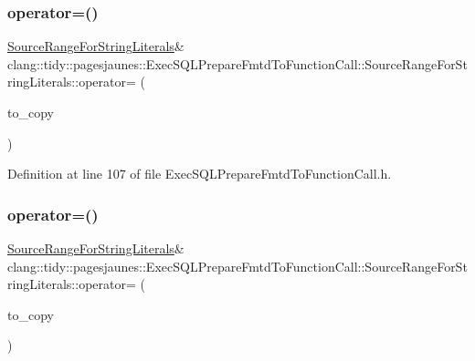 \subsubsection{\texorpdfstring{operator=()}{operator=()}\hspace{0.1cm}{\footnotesize\ttfamily [1/2]}}
{\footnotesize\ttfamily \hyperlink{classclang_1_1tidy_1_1pagesjaunes_1_1_exec_s_q_l_prepare_fmtd_to_function_call_1_1_source_range_for_string_literals}{Source\+Range\+For\+String\+Literals}\& clang\+::tidy\+::pagesjaunes\+::\+Exec\+S\+Q\+L\+Prepare\+Fmtd\+To\+Function\+Call\+::\+Source\+Range\+For\+String\+Literals\+::operator= (\begin{DoxyParamCaption}\item[{const \hyperlink{classclang_1_1tidy_1_1pagesjaunes_1_1_exec_s_q_l_prepare_fmtd_to_function_call_1_1_source_range_for_string_literals}{Source\+Range\+For\+String\+Literals} \&}]{to\+\_\+copy }\end{DoxyParamCaption})\hspace{0.3cm}{\ttfamily [inline]}}



Definition at line 107 of file Exec\+S\+Q\+L\+Prepare\+Fmtd\+To\+Function\+Call.\+h.

\mbox{\label{classclang_1_1tidy_1_1pagesjaunes_1_1_exec_s_q_l_prepare_fmtd_to_function_call_1_1_source_range_for_string_literals_afa999c9ce9572562f1c7c3f086776203}} 
\subsubsection{\texorpdfstring{operator=()}{operator=()}\hspace{0.1cm}{\footnotesize\ttfamily [2/2]}}
{\footnotesize\ttfamily \hyperlink{classclang_1_1tidy_1_1pagesjaunes_1_1_exec_s_q_l_prepare_fmtd_to_function_call_1_1_source_range_for_string_literals}{Source\+Range\+For\+String\+Literals}\& clang\+::tidy\+::pagesjaunes\+::\+Exec\+S\+Q\+L\+Prepare\+Fmtd\+To\+Function\+Call\+::\+Source\+Range\+For\+String\+Literals\+::operator= (\begin{DoxyParamCaption}\item[{\hyperlink{classclang_1_1tidy_1_1pagesjaunes_1_1_exec_s_q_l_prepare_fmtd_to_function_call_1_1_source_range_for_string_literals}{Source\+Range\+For\+String\+Literals} \&}]{to\+\_\+copy }\end{DoxyParamCaption})\hspace{0.3cm}{\ttfamily [inline]}}



